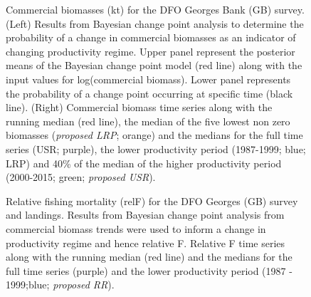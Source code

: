 \documentclass[11pt]{article}
\newcommand{\e}{/backup/bio_data/bio.lobster/figures/} %
\begin{document}
\begin{landscape}
\begin{figure}
\centering
       \caption{Commercial biomasses (kt) for the DFO Georges Bank (GB) survey. (Left) Results from Bayesian change point analysis to determine the probability of a change in commercial biomasses as an indicator of changing productivity regime. Upper panel represent the posterior means of the Bayesian change point model (red line) along with the input values for log(commercial biomass). Lower panel represents the probability of a change point occurring at specific time (black line). (Right) Commercial biomass time series along with the running median (red line), the median of the five lowest non zero biomasses (\emph{proposed LRP}; orange) and the medians for the full time series (USR; purple), the lower productivity period (1987-1999; blue; LRP) and 40\% of the median of the higher productivity period (2000-2015; green; \emph{proposed USR}). }

\end{figure}
\end{landscape}
     \clearpage

\begin{figure}
\centering
       \caption{Relative fishing mortality (relF) for the DFO Georges (GB) survey and landings. Results from Bayesian change point analysis from commercial biomass trends were used to inform a change in productivity regime and hence relative F. Relative F time series along with the running median (red line) and the medians for the full time series (purple) and the lower productivity period (1987 - 1999;blue; \emph{proposed RR}). }
\end{figure}
     \clearpage
\end{document}
